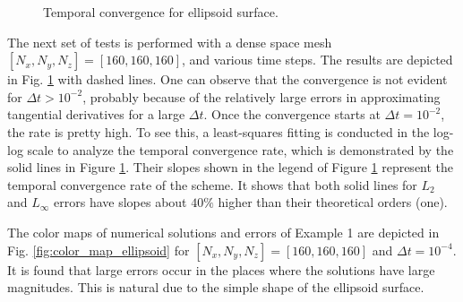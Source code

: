 \documentclass[dissertation]{uathesis}
\begin{document}
\begin{body}
\begin{figure}[!tb]
\begin{center}
	\end{center}
	\caption{Temporal convergence for ellipsoid surface.}
	\label{fig:temporal_convergence_ellipsoid}
\end{figure}
%
The next set of tests is performed with a dense space mesh $[N_{x},N_{y},N_{z}]=[160,160,160]$, and various time steps. The results are depicted in Fig. \ref{fig:temporal_convergence_ellipsoid} with dashed lines. 
One can observe that the convergence is not evident for  $\Delta t > 10^{-2}$,
probably because of the relatively large errors in approximating tangential derivatives for a large $\Delta t$. Once the convergence starts at $\Delta t=10^{-2}$, the rate is pretty high. To see this,  a least-squares fitting \cite{zhao2009matched} is conducted in the log-log scale to analyze the temporal convergence rate, which is demonstrated by the solid lines in Figure \ref{fig:temporal_convergence_ellipsoid}. Their slopes shown in the legend of 
Figure \ref{fig:temporal_convergence_ellipsoid}
represent the temporal convergence rate of the scheme. It shows that both solid lines for $L_2$ and $L_{\infty}$ errors have slopes about $40\%$ higher than their theoretical orders (one). 

The color maps of numerical solutions and errors of Example 1 are depicted in Fig. \ref{fig:color_map_ellipsoid} for  $[N_{x},N_{y},N_{z}]=[160,160,160]$ and $\Delta t=10^{-4}$. It is found that large errors occur in the places where the solutions have large magnitudes. This is natural due to the simple shape of the ellipsoid surface.  


\end{body}
\end{document}
